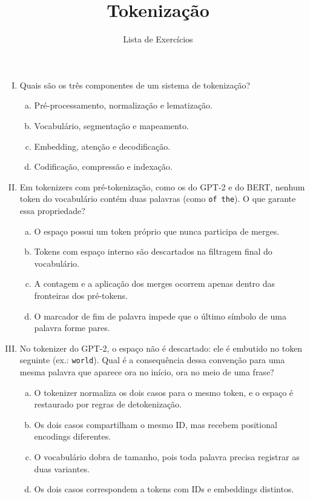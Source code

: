 \documentclass{dlproblemset}
\title{Tokenização}
\subtitle{Lista de Exercícios}
\begin{document}
\begin{enumerate}[I)]

\item Quais são os três componentes de um sistema de tokenização?

\begin{enumerate}[a)]
    \item Pré-processamento, normalização e lematização.
    \item Vocabulário, segmentação e mapeamento.
    \item Embedding, atenção e decodificação.
    \item Codificação, compressão e indexação.
\end{enumerate}

\item Em tokenizers com pré-tokenização, como os do GPT-2 e do BERT, nenhum token
      do vocabulário contém duas palavras (como \texttt{of the}). O que garante
      essa propriedade?

\begin{enumerate}[a)]
    \item O espaço possui um token próprio que nunca participa de merges.
    \item Tokens com espaço interno são descartados na filtragem final do vocabulário.
    \item A contagem e a aplicação dos merges ocorrem apenas dentro das fronteiras
          dos pré-tokens.
    \item O marcador de fim de palavra impede que o último símbolo de uma palavra
          forme pares.
\end{enumerate}

\item No tokenizer do GPT-2, o espaço não é descartado: ele é embutido no token
      seguinte (ex.: \texttt{\textvisiblespace world}). Qual é a consequência dessa
      convenção para uma mesma palavra que aparece ora no início, ora no meio de
      uma frase?

\begin{enumerate}[a)]
    \item O tokenizer normaliza os dois casos para o mesmo token, e o espaço é
          restaurado por regras de detokenização.
    \item Os dois casos compartilham o mesmo ID, mas recebem positional encodings
          diferentes.
    \item O vocabulário dobra de tamanho, pois toda palavra precisa registrar as
          duas variantes.
    \item Os dois casos correspondem a tokens com IDs e embeddings distintos.
\end{enumerate}


\end{enumerate}
\end{document}

